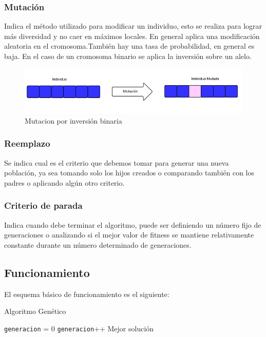\subsubsection{Mutación} 
Indica el método utilizado para modificar un individuo, esto se realiza para lograr más diversidad y no caer en máximos locales. En general aplica una modificación aleatoria en el cromosoma.También hay una tasa de probabilidad, en general es baja. En el caso de un cromosoma binario se aplica la inversión sobre un alelo.

\begin{figure}[h]
	\centering
	\includegraphics[width=1\linewidth]{Figures/mutacion1}
	\caption{Mutacion por inversión binaria}
	\label{fig:mutacion1}
\end{figure}


\subsubsection{Reemplazo} 
Se indica cual es el criterio que debemos tomar para generar una nueva población, ya sea tomando solo los hijos creados o comparando también con los padres o aplicando algún otro criterio.

\subsubsection{Criterio de parada} 
Indica cuando debe terminar el algoritmo, puede ser definiendo un número fijo de generaciones o analizando si el mejor valor de fitness se mantiene relativamente constante durante un número determinado de generaciones.

\subsection{Funcionamiento}

El esquema básico de funcionamiento es el siguiente:


\begin{algorithm}%
	\caption{Algoritmo Genético}
	\label{alg:algoritmo_genetico_simple}
	\begin{algorithmic} [1] 
		{
			\STATE \texttt{generacion} = 0
			\STATE \texttt{generacion}++
			\ENDWHILE
			\RETURN Mejor solución
		}
	\end{algorithmic}
\end{algorithm}



